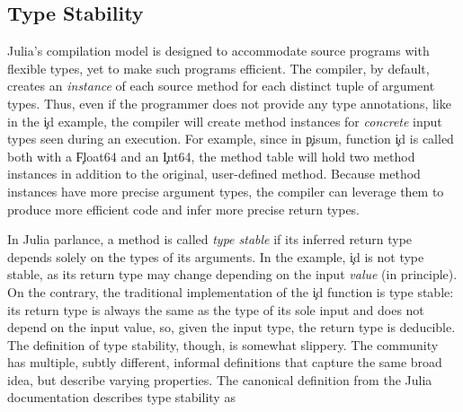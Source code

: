\subsection{Type Stability}\label{ssect:ts-informal}

Julia's compilation model is designed to accommodate source programs
with flexible types, yet to make such programs efficient. The compiler, by
default, creates an \emph{instance} of each source method for each distinct tuple of
argument types. Thus, even if the programmer does not provide any type
annotations, like in the \c{id} example, the compiler will create method
instances for \emph{concrete} input types seen during
an execution. For example, since in \c{pisum}, function \c{id} is called both
with a \c{Float64} and an \c{Int64}, the method table will hold two method instances
in addition to the original, user-defined method.
Because method instances have more precise argument types, the compiler can
leverage them to produce more efficient code and infer more precise return types.

In Julia parlance, a method is called \emph{type stable} if its inferred return
type depends solely on the types of its arguments. In the example, \c{id} is not
type stable, as its return type may change depending on the input \emph{value}
(in principle). On the contrary, the traditional implementation of the \c{id}
function is type stable: its return type is always the same as the type of its
sole input and does not depend on the input value, so, given the input type, the
return type is deducible.
The definition of type stability, though, is somewhat slippery.
The community has multiple, subtly different, informal definitions that capture
the same broad idea, but describe varying properties. The canonical definition
from the Julia documentation describes type stability as

